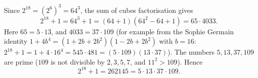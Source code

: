 Since $2^{18}=\left(2^6\right)^3=64^3$, the sum of cubes factorisation gives
\[
2^{18}+1=64^3+1=(64+1)\left(64^2-64+1\right)=65\cdot4033 .
\]
Here $65=5\cdot13$, and $4033=37\cdot109$ (for example from the Sophie Germain identity $1+4b^4=(1+2b+2b^2)(1-2b+2b^2)$ with $b=16$: $2^{18}+1=1+4\cdot16^4=545\cdot481=(5\cdot109)(13\cdot37)$). The numbers $5,13,37,109$ are prime ($109$ is not divisible by $2,3,5,7$, and $11^2>109$). Hence
\[
2^{18}+1=262145=\boxed{5\cdot13\cdot37\cdot109}.
\]

